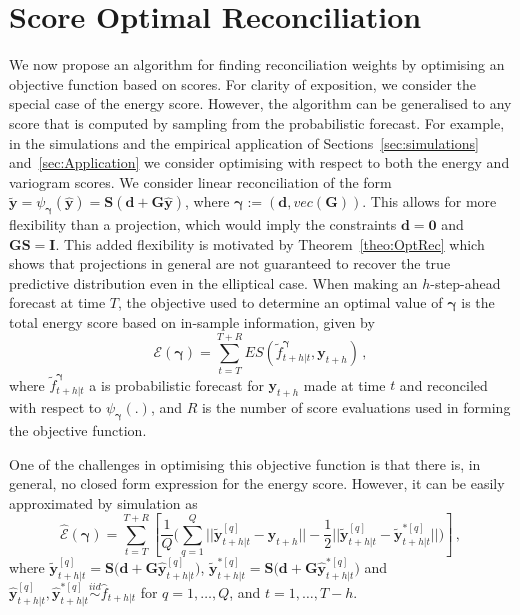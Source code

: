 \documentclass[11pt]{article}
\theoremstyle{definition}
\begin{document}
\section{Score Optimal Reconciliation}\label{sec:scoreoptSGD}

We now propose an algorithm for finding reconciliation weights by optimising an objective function based on scores. For clarity of exposition, we consider the special case of the energy score. However, the algorithm can be generalised to any score that is computed by sampling from the probabilistic forecast. For example, in the simulations and the empirical application of Sections~\ref{sec:simulations} and~\ref{sec:Application} we consider optimising with respect to both the energy and variogram scores. We consider linear reconciliation of the form $\tilde{\bm{y}}=\psi_{\bm{\gamma}}({\bm{\hat{y}}})={\bm{S}}\left(\bm{d}+\bm{G}{\bm{\hat{y}}}\right)$, where ${\bm\gamma}:=\left(\bm{d},vec(\bm{G})\right)$. This allows for more flexibility than a projection, which would imply the constraints $\bm{d}=\bm{0}$ and $\bm{G}\bm{S}=\bm{I}$. This added flexibility is motivated by Theorem~\ref{theo:OptRec} which shows that projections in general are not guaranteed to recover the true predictive distribution even in the elliptical case. When making an $h$-step-ahead forecast at time $T$, the objective used to determine an optimal value of $\bm{\gamma}$ is the total energy score based on in-sample information, given by
\begin{equation}
\mathcal{E}\left(\bm{\gamma}\right)=\sum\limits_{t=T}^{T+R} \textit{ES}(\tilde{f}^{\bm{\gamma}}_{t+h|t},\bm{y}_{t+h})\,,
\label{eq:tes}
\end{equation}
where $\tilde{f}^{\bm{\bm{\gamma}}}_{t+h|t}$ a is probabilistic forecast for $\bm{y}_{t+h}$ made at time $t$ and reconciled with respect to $\psi_{\bm{\gamma}}(.)$, and $R$ is the number of score evaluations used in forming the objective function.

One of the challenges in optimising this objective function is that there is, in general, no closed form expression for the energy score. However, it can be easily approximated by simulation as
\begin{equation}
\hat{\mathcal{E}}\left(\bm{\gamma}\right)=\sum\limits_{t=T}^{T+R}\left[\frac{1}{Q}\bigg(\sum\limits_{q=1}^{Q}||\tilde{\bm{y}}^{[q]}_{t+h|t}-\bm{y}_{t+h}||-\frac{1}{2}||\tilde{\bm{y}}_{t+h|t}^{[q]}-\tilde{\bm{y}}^{*[q]}_{t+h|t}||\bigg)\right]\,,
\label{eq:obj_mc}
\end{equation}
where $\tilde{\bm{y}}^{[q]}_{t+h|t}=\bm{S}\big(\bm{d}+\bm{G}{\hat{\bm{y}}}^{[q]}_{t+h|t}\big)$, $\tilde{\bm{y}}^{*[q]}_{t+h|t}=\bm{S}\big(\bm{d}+\bm{G}{\hat{\bm{y}}}^{*[q]}_{t+h|t}\big)$ and ${\hat{\bm{y}}}^{[q]}_{t+h|t},{\hat{\bm{y}}}^{*[q]}_{t+h|t}\overset{iid}{\sim} \hat{f}_{t+h|t}$ for $q=1,\ldots,Q$, and $t=1,\ldots,T-h$.
\end{document}
